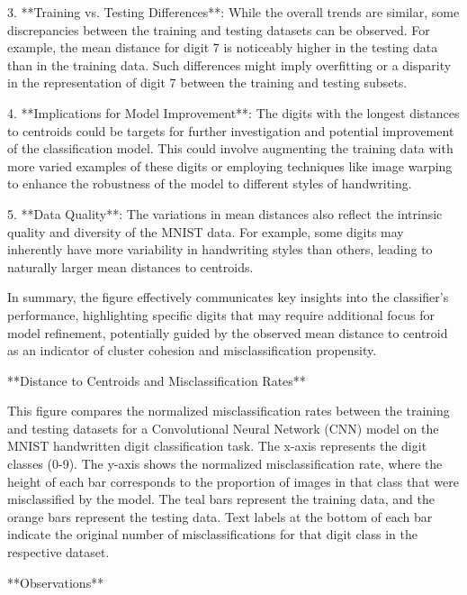 3. **Training vs. Testing Differences**: While the overall trends are similar, some discrepancies between the training and testing datasets can be observed. For example, the mean distance for digit 7 is noticeably higher in the testing data than in the training data. Such differences might imply overfitting or a disparity in the representation of digit 7 between the training and testing subsets.

4. **Implications for Model Improvement**: The digits with the longest distances to centroids could be targets for further investigation and potential improvement of the classification model. This could involve augmenting the training data with more varied examples of these digits or employing techniques like image warping to enhance the robustness of the model to different styles of handwriting.

5. **Data Quality**: The variations in mean distances also reflect the intrinsic quality and diversity of the MNIST data. For example, some digits may inherently have more variability in handwriting styles than others, leading to naturally larger mean distances to centroids.

In summary, the figure effectively communicates key insights into the classifier's performance, highlighting specific digits that may require additional focus for model refinement, potentially guided by the observed mean distance to centroid as an indicator of cluster cohesion and misclassification propensity.


**Distance to Centroids and Misclassification Rates**

This figure compares the normalized misclassification rates between the training and testing datasets for a Convolutional Neural Network (CNN) model on the MNIST handwritten digit classification task. The x-axis represents the digit classes (0-9). The y-axis shows the normalized misclassification rate, where the height of each bar corresponds to the proportion of images in that class that were misclassified by the model. The teal bars represent the training data, and the orange bars represent the testing data. Text labels at the bottom of each bar indicate the original number of misclassifications for that digit class in the respective dataset.

**Observations**

